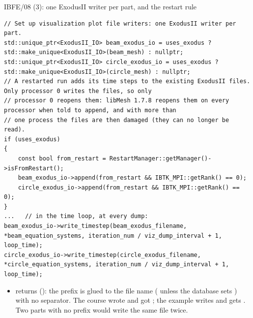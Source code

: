 \documentclass[aspectratio=169,11pt]{beamer}
\begin{document}
\begin{frame}[fragile]{IBFE/08 (3): one ExodusII writer per part, and the restart rule}
\label{fr:exodus}
\footnotesize
\begin{lstlisting}[style=cpptiny]
// Set up visualization plot file writers: one ExodusII writer per part.
std::unique_ptr<ExodusII_IO> beam_exodus_io = uses_exodus ? std::make_unique<ExodusII_IO>(beam_mesh) : nullptr;
std::unique_ptr<ExodusII_IO> circle_exodus_io = uses_exodus ? std::make_unique<ExodusII_IO>(circle_mesh) : nullptr;
// A restarted run adds its time steps to the existing ExodusII files. Only processor 0 writes the files, so only
// processor 0 reopens them: libMesh 1.7.8 reopens them on every processor when told to append, and with more than
// one process the files are then damaged (they can no longer be read).
if (uses_exodus)
{
    const bool from_restart = RestartManager::getManager()->isFromRestart();
    beam_exodus_io->append(from_restart && IBTK_MPI::getRank() == 0);
    circle_exodus_io->append(from_restart && IBTK_MPI::getRank() == 0);
}
...   // in the time loop, at every dump:
beam_exodus_io->write_timestep(beam_exodus_filename, *beam_equation_systems, iteration_num / viz_dump_interval + 1, loop_time);
circle_exodus_io->write_timestep(circle_exodus_filename, *circle_equation_systems, iteration_num / viz_dump_interval + 1, loop_time);
\end{lstlisting}
\begin{itemize}
  \item {} returns  (): the prefix is glued to the file name ( unless the  database sets ) with no separator. The course wrote  and got ; the example writes  and gets . Two parts with no prefix would write the same file twice.
\end{itemize}
\end{frame}
\end{document}
